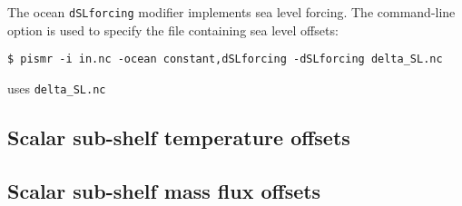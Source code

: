 \documentclass[titlepage,letterpaper,final]{scrartcl}
\begin{document}
The ocean \texttt{dSLforcing} modifier implements sea level forcing. The
command-line option  is used to specify the file containing
sea level offsets:
\begin{verbatim}
$ pismr -i in.nc -ocean constant,dSLforcing -dSLforcing delta_SL.nc
\end{verbatim}%
uses \texttt{delta_SL.nc}

\subsection{Scalar sub-shelf temperature offsets}
\label{sec:delta-subshelf-temp}


\subsection{Scalar sub-shelf mass flux offsets}
\label{sec:delta-subshelf-smb}



\clearpage\newpage



{}
\label{sect:index}
{\small \printindex }

{}
{ \small \printindex[options] }
\end{document}
